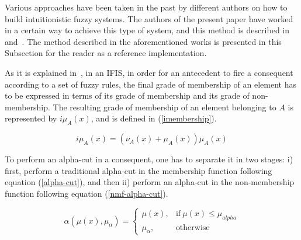 \documentclass{ieeeaccess}
\begin{document}
Various approaches have been taken in the past by different authors on how to
build intuitionistic fuzzy systems. %
The authors of the present paper have worked in a certain way to achieve this type of system, 
and this method is described in~\cite{Hernandez-Aguila2016} and~\cite{Hernandez-Aguila2017-2}. %
The method described in the aforementioned works is presented in this Subsection for
the reader as a reference implementation.


As it is explained in~\cite{Hernandez-Aguila2016}, in an IFIS, in order for an
antecedent to fire a consequent according to a set of fuzzy rules, the final
grade of membership of an element has to be expressed in terms of its grade of
membership and its grade of non-membership. The resulting grade of membership of
an element belonging to $A$ is represented by $i\mu_{A}(x)$, and is defined in
(\ref{imembership}).

\begin{equation}
  \label{imembership}
  i\mu_{A}(x) = (\nu_{A}(x) + \mu_{A}(x))\mu_{A}(x)
\end{equation}

To perform an alpha-cut in a consequent, one has to separate it in two stages:
i) first, perform a traditional alpha-cut in the membership function following equation
(\ref{alpha-cut}), and then ii) perform an alpha-cut in the non-membership
function following equation (\ref{nmf-alpha-cut}).

\begin{equation}
  \label{alpha-cut}
  \alpha(\mu (x),\mu_{\alpha}) =
  \begin{cases}
    \mu (x), & \text{if}\ \mu (x) \leq \mu_{alpha}  \\
    \mu_{\alpha}, & \text{otherwise}
  \end{cases}
\end{equation}
\end{document}
